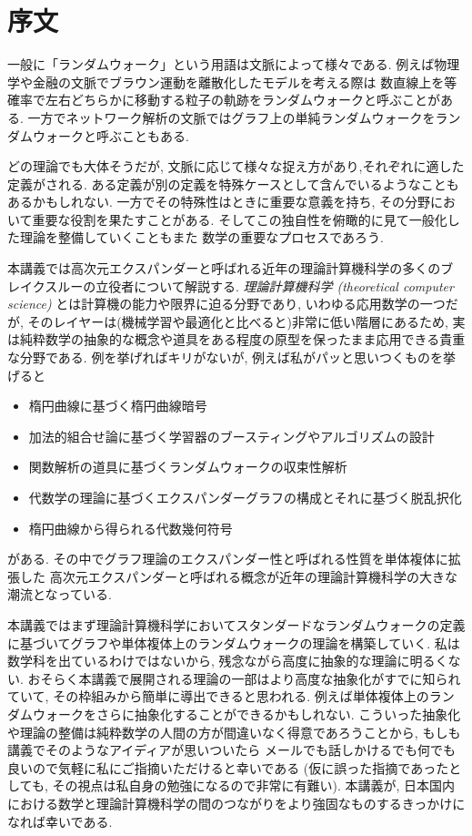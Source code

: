 \chapter*{序文}
一般に「ランダムウォーク」という用語は文脈によって様々である.
例えば物理学や金融の文脈でブラウン運動を離散化したモデルを考える際は
数直線上を等確率で左右どちらかに移動する粒子の軌跡をランダムウォークと呼ぶことがある.
一方でネットワーク解析の文脈ではグラフ上の単純ランダムウォークをランダムウォークと呼ぶこともある.

どの理論でも大体そうだが, 文脈に応じて様々な捉え方があり,それぞれに適した定義がされる.
ある定義が別の定義を特殊ケースとして含んでいるようなこともあるかもしれない.
一方でその特殊性はときに重要な意義を持ち, その分野において重要な役割を果たすことがある.
そしてこの独自性を俯瞰的に見て一般化した理論を整備していくこともまた
    数学の重要なプロセスであろう.

本講義では高次元エクスパンダーと呼ばれる近年の理論計算機科学の多くのブレイクスルーの立役者について解説する.
\emph{理論計算機科学 (theoretical computer science)} とは計算機の能力や限界に迫る分野であり, いわゆる応用数学の一つだが, そのレイヤーは(機械学習や最適化と比べると)非常に低い階層にあるため,
    実は純粋数学の抽象的な概念や道具をある程度の原型を保ったまま応用できる貴重な分野である.
例を挙げればキリがないが, 例えば私がパッと思いつくものを挙げると
\begin{itemize}
    \item 楕円曲線に基づく楕円曲線暗号
    \item 加法的組合せ論に基づく学習器のブースティングやアルゴリズムの設計
    \item 関数解析の道具に基づくランダムウォークの収束性解析
    \item 代数学の理論に基づくエクスパンダーグラフの構成とそれに基づく脱乱択化
    \item 楕円曲線から得られる代数幾何符号
\end{itemize}
がある.
その中でグラフ理論のエクスパンダー性と呼ばれる性質を単体複体に拡張した
    高次元エクスパンダーと呼ばれる概念が近年の理論計算機科学の大きな潮流となっている.

本講義ではまず理論計算機科学においてスタンダードなランダムウォークの定義に基づいてグラフや単体複体上のランダムウォークの理論を構築していく.
私は数学科を出ているわけではないから, 残念ながら高度に抽象的な理論に明るくない.
おそらく本講義で展開される理論の一部はより高度な抽象化がすでに知られていて, その枠組みから簡単に導出できると思われる.
例えば単体複体上のランダムウォークをさらに抽象化することができるかもしれない.
こういった抽象化や理論の整備は純粋数学の人間の方が間違いなく得意であろうことから,
もしも講義でそのようなアイディアが思いついたら
メールでも話しかけるでも何でも良いので気軽に私にご指摘いただけると幸いである
(仮に誤った指摘であったとしても, その視点は私自身の勉強になるので非常に有難い).
本講義が, 日本国内における数学と理論計算機科学の間のつながりをより強固なものするきっかけになれば幸いである.